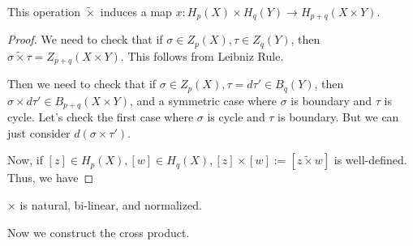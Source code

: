 \begin{claim}
	This operation $\tilde \times $ induces a map $x : H_p(X) \times H_q(Y) \to H_{p + q}(X \times Y)$.
\end{claim}
\begin{proof}
	We need to check that if $\sigma \in Z_p(X), \tau \in Z_q(Y)$, then $\sigma \tilde \times \tau = Z_{p + q}(X \times Y)$. This follows from Leibniz Rule.

	Then we need to check that if $\sigma \in Z_p(X), \tau = d \tau'  \in B_q(Y)$, then $\sigma \times d \tau' \in B_{p + q}(X \times Y)$, and a symmetric case where $\sigma$ is boundary and $\tau $ is cycle. Let's check the first case where $\sigma$ is cycle and $\tau$ is boundary. But we can just consider $d(\sigma \times \tau')$.

	Now, if $[z] \in H_p(X), [w] \in H_q(X), [z] \times [w] := [z \tilde \times w]$ is well-defined. Thus, we have
\end{proof}

\begin{theorem}
	\label{thm:HomologyCrossProduct}
	$\times $ is natural, bi-linear, and normalized.
\end{theorem}

Now we construct the cross product.

